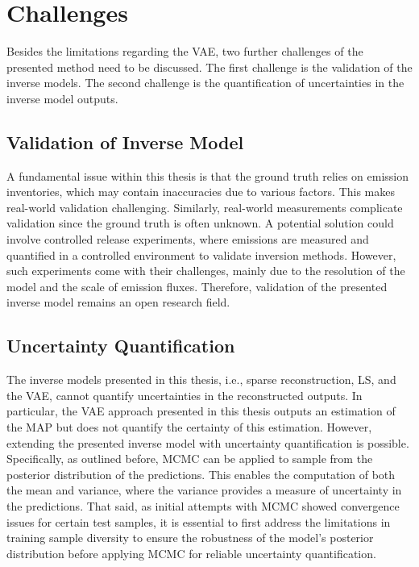 \section{Challenges}
Besides the limitations regarding the \gls{VAE}, two further challenges of the presented method need to be discussed.
The first challenge is the validation of the inverse models.
The second challenge is the quantification of uncertainties in the inverse model outputs.

\subsection{Validation of Inverse Model}
A fundamental issue within this thesis is that the ground truth relies on emission inventories, which may contain inaccuracies due to various factors.
This makes real-world validation challenging.
Similarly, real-world measurements complicate validation since the ground truth is often unknown.
A potential solution could involve controlled release experiments, where emissions are measured and quantified in a controlled environment to validate inversion methods.
However, such experiments come with their challenges, mainly due to the resolution of the model and the scale of emission fluxes.
Therefore, validation of the presented inverse model remains an open research field.

\subsection{Uncertainty Quantification}

The inverse models presented in this thesis, i.e., sparse reconstruction, \gls{LS}, and the \gls{VAE}, cannot quantify uncertainties in the reconstructed outputs.
In particular, the \gls{VAE} approach presented in this thesis outputs an estimation of the \gls{MAP} but does not quantify the certainty of this estimation.
However, extending the presented inverse model with uncertainty quantification is possible.
Specifically, as outlined before, \gls{MCMC} \parencite{MCMC, VAE-MCMC} can be applied to sample from the posterior distribution of the predictions.
This enables the computation of both the mean and variance, where the variance provides a measure of uncertainty in the predictions.
That said, as initial attempts with \gls{MCMC} showed convergence issues for certain test samples, it is essential to first address the limitations in training sample diversity to ensure the robustness of the model’s posterior distribution before applying \gls{MCMC} for reliable uncertainty quantification.

